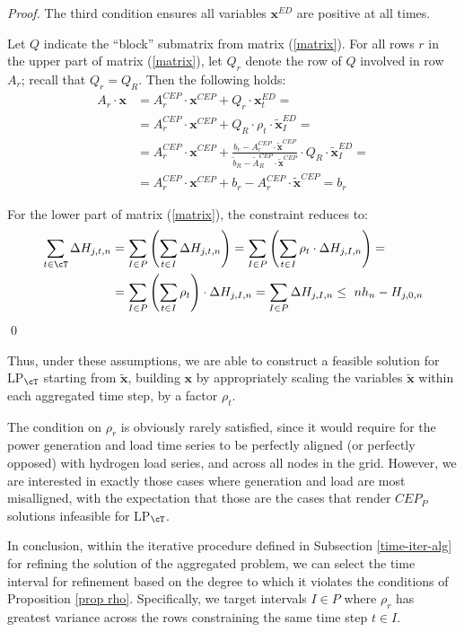 \documentclass[smallextended,natbib]{svjour3}       %
\numberwithin{definition}{section}
\numberwithin{theorem}{section}
\numberwithin{proposition}{section}
\begin{document}
\begin{proof}
  The third condition ensures all variables $\mathbf{x}^{ED}$ are positive at all times.

  Let $Q$ indicate the ``block'' submatrix from matrix (\ref{matrix}). 
  For all rows $r$ in the upper part of matrix (\ref{matrix}), let $Q_r$ denote the row of $Q$ involved in row $A_r$; recall that $Q_r=Q_R$. Then the following holds:
\begin{align*}
A_r \cdot \mathbf{x} &=A^{CEP}_r\cdot \mathbf{x}^{CEP} +  Q_r\cdot \mathbf{x}^{ED}_t = \\
&=A^{CEP}_r\cdot \mathbf{x}^{CEP} +  Q_R\cdot \rho_t\cdot\tilde{\mathbf{x}}^{ED}_I = \\
&=A^{CEP}_r\cdot \mathbf{x}^{CEP} + \frac{b_r - A_r^{CEP} \cdot \tilde{\mathbf{x}}^{CEP}}{\tilde{b}_R - \tilde{A}_R^{CEP}\cdot \tilde{\mathbf{x}}^{CEP}} \cdot Q_R \cdot \tilde{\mathbf{x}}^{ED}_I =\\
&=A^{CEP}_r\cdot \mathbf{x}^{CEP} + b_r - A^{CEP}_r\cdot \tilde{\mathbf{x}}^{CEP} = b_r
\end{align*}

For the lower part of matrix (\ref{matrix}), the constraint reduces to:
\begin{align*}
\sum_{t\in \cT} \Delta H_{j,t,n} &= \sum_{I\in P} \left( \sum_{t\in I} \Delta H_{j,t,n} \right) = \sum_{I\in P} \left( \sum_{t\in I} \rho_t\cdot\Delta H_{j,I,n} \right) = \\
& = \sum_{I\in P} \left( \sum_{t\in I} \rho_t \right)\cdot\Delta H_{j,I,n} =  \sum_{I\in P}\Delta H_{j,I,n} \le \ nh_n - H_{j,0,n}
\end{align*}
\qed\end{proof}

Thus, under these assumptions, we are able to construct a feasible solution for LP$_{\cT}$ starting from $\tilde{\mathbf{x}}$, building $\mathbf{x}$ by appropriately scaling the variables  $\tilde{\mathbf{x}}$ within each aggregated time step, by a factor $\rho_t$.

The condition on $\rho_r$ is obviously rarely satisfied, since it would require for the power generation and load time series to be perfectly aligned (or perfectly opposed) with hydrogen load series, and across all nodes in the grid.
However, we are interested in exactly those cases where generation and load are most misalligned, with the expectation that those are the cases that render $CEP_P$ solutions infeasible for LP$_{\cT}$.

In conclusion, within the iterative procedure defined in Subsection \ref{time-iter-alg} for refining the solution of the aggregated problem, we can select the time interval for refinement based on the degree to which it violates the conditions of Proposition \ref{prop rho}.
Specifically, we target intervals $I\in P$ where $\rho_r$ has greatest variance across the rows constraining the same time step $t\in I$. 
\end{document}
